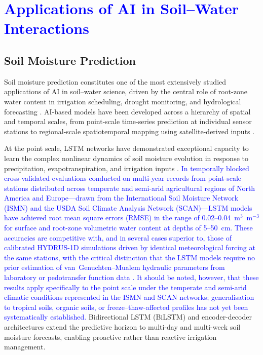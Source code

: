 \documentclass[land,article,submit,pdftex,moreauthors]{Definitions/mdpi}
\numberwithin{equation}{section}
\begin{document}
\section{\textcolor{blue}{Applications of AI in Soil--Water Interactions}}

\subsection{Soil Moisture Prediction}

Soil moisture prediction constitutes one of the most extensively studied applications of AI in soil--water science, driven by the central role of root-zone water content in irrigation scheduling, drought monitoring, and hydrological forecasting \cite{hess2024}. AI-based models have been developed across a hierarchy of spatial and temporal scales, from point-scale time-series prediction at individual sensor stations to regional-scale spatiotemporal mapping using satellite-derived inputs \citep{fang2019deep}.

At the point scale, LSTM networks have demonstrated exceptional capacity to learn the complex nonlinear dynamics of soil moisture evolution in response to precipitation, evapotranspiration, and irrigation inputs \cite{Datta}. \textcolor{blue}{In temporally blocked cross-validated evaluations conducted on multi-year records from point-scale stations distributed across temperate and semi-arid agricultural regions of North America and Europe---drawn from the International Soil Moisture Network (ISMN) and the USDA Soil Climate Analysis Network (SCAN)---LSTM models have achieved root mean square errors (RMSE) in the range of 0.02--0.04~m$^3$~m$^{-3}$ for surface and root-zone volumetric water content at depths of 5--50~cm. These accuracies are competitive with, and in several cases superior to, those of calibrated HYDRUS-1D simulations driven by identical meteorological forcing at the same stations, with the critical distinction that the LSTM models require no prior estimation of van~Genuchten--Mualem hydraulic parameters from laboratory or pedotransfer function data \citep{kratzert2018rainfall}. It should be noted, however, that these results apply specifically to the point scale under the temperate and semi-arid climatic conditions represented in the ISMN and SCAN networks; generalisation to tropical soils, organic soils, or freeze--thaw-affected profiles has not yet been systematically established.} Bidirectional LSTM (BiLSTM) and encoder-decoder architectures extend the predictive horizon to multi-day and multi-week soil moisture forecasts, enabling proactive rather than reactive irrigation management.
\end{document}
